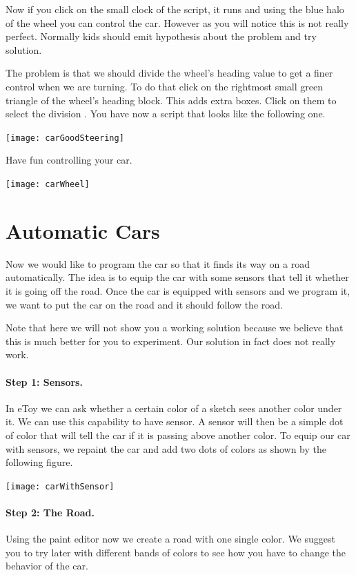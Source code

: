 Now if you click on the small clock of the script, it runs and using the blue halo of the wheel you can control 
the car. However as you will notice this is not really perfect. Normally kids should emit hypothesis about the problem and try solution.

The problem is that we should divide the wheel's heading value to get a finer control when we are turning. To do that click on the rightmost small green triangle of the wheel's heading block. This adds extra boxes. Click on them to select the division \ct{//}. You have now a script that looks like the following one.
\begin{center}\texttt{[image: carGoodSteering]}\end{center}

Have fun controlling your car. 
\begin{center}\texttt{[image: carWheel]}\end{center}


\section{Automatic Cars}
Now we would like to program the car so that it finds its way on a road automatically. The idea is to equip the car with some sensors
that tell it whether it is going off the road. Once the car is equipped with sensors and we program it, we want to put the car on the road and it should follow the road. 

Note that here we will not show you a working solution because we believe that this is much better for you to experiment. Our solution in fact does not really work. 

\paragraph{Step 1: Sensors.}
In eToy we can ask whether a certain color of a sketch sees another color under it. We can use this capability to have sensor. A sensor will then be a simple dot of color that will tell the car if it is passing above another color. To equip our car with sensors, we repaint the car and add two dots of colors as shown by the following figure. 
\begin{center}\texttt{[image: carWithSensor]}\end{center}

\paragraph{Step 2: The Road.} Using the paint editor now we create a road with one single color. We suggest you to try later  with different bands of colors to see how you have to change the behavior of the car.

